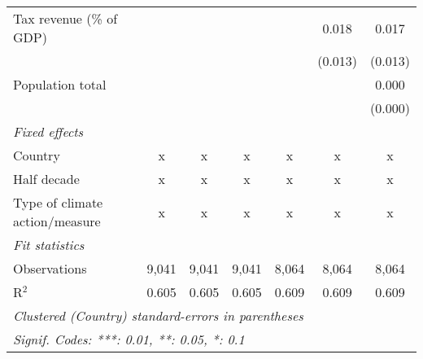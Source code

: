 \begin{tabular}{lcccccc}
   Tax revenue (\% of GDP)                                         &               &               &              &               & 0.018         & 0.017\\   
                                                                   &               &               &              &               & (0.013)       & (0.013)\\   
   Population total                                                &               &               &              &               &               & 0.000\\   
                                                                   &               &               &              &               &               & (0.000)\\   
   \emph{Fixed effects}\\
   Country                                                         & x             & x             & x            & x             & x             & x\\  
   Half decade                                                     & x             & x             & x            & x             & x             & x\\  
   Type of climate action/measure                                  & x             & x             & x            & x             & x             & x\\  
   \midrule \emph{Fit statistics}\\
   Observations                                                    & 9,041         & 9,041         & 9,041        & 8,064         & 8,064         & 8,064\\  
   R$^2$                                                           & 0.605         & 0.605         & 0.605        & 0.609         & 0.609         & 0.609\\  
   \midrule
   \multicolumn{7}{l}{\emph{Clustered (Country) standard-errors in parentheses}}\\
   \multicolumn{7}{l}{\emph{Signif. Codes: ***: 0.01, **: 0.05, *: 0.1}}\\
\end{tabular}
\par\endgroup


